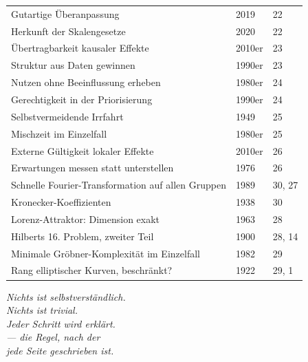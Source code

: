 {\begin{longtable}{@{}P{5.0cm}P{1.6cm}P{1.8cm}@{}}
Gutartige Überanpassung & 2019 & 22\\
Herkunft der Skalengesetze & 2020 & 22\\
Übertragbarkeit kausaler Effekte & 2010er & 23\\
Struktur aus Daten gewinnen & 1990er & 23\\
Nutzen ohne Beeinflussung erheben & 1980er & 24\\
Gerechtigkeit in der Priorisierung & 1990er & 24\\
Selbstvermeidende Irrfahrt & 1949 & 25\\
Mischzeit im Einzelfall & 1980er & 25\\
Externe Gültigkeit lokaler Effekte & 2010er & 26\\
Erwartungen messen statt unterstellen & 1976 & 26\\
Schnelle Fourier-Transformation auf allen Gruppen & 1989 & 30, 27\\
Kronecker-Koeffizienten & 1938 & 30\\
Lorenz-Attraktor: Dimension exakt & 1963 & 28\\
Hilberts 16. Problem, zweiter Teil & 1900 & 28, 14\\
Minimale Gröbner-Komplexität im Einzelfall & 1982 & 29\\
Rang elliptischer Kurven, beschränkt? & 1922 & 29, 1\\
\bottomrule
\end{longtable}}

\bigskip
\begin{flushright}
\itshape\color{grau}
Nichts ist selbstverständlich.\\
Nichts ist trivial.\\
Jeder Schritt wird erklärt.\\[10pt]
\normalfont\color{grau}\upshape
--- die Regel, nach der\\
\itshape jede Seite geschrieben ist.
\end{flushright}